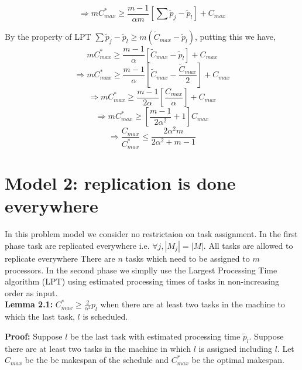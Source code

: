 \documentclass[10pt, conference, compsocconf]{IEEEtran}
\begin{document}
\begin{equation}\nonumber
\Rightarrow m C_{max}^{*}\geq \frac{m-1}{\alpha m} [\sum \tilde p_j-\tilde p_l] + {C_{max}}
 \end{equation}

By the property of LPT $\sum \tilde p_j-\tilde p_l \geq m (\tilde C_{max}-\tilde p_l)$, putting this we have,\\
\begin{equation}\nonumber 
 m C_{max}^{*}\geq \frac{m-1}{\alpha } \left[\tilde C_{max}-\tilde p_l\right] + {C_{max}}
 \end{equation}
\begin{equation}\nonumber
\Rightarrow m C_{max}^{*}\geq \frac{m-1}{\alpha } \left[\tilde C_{max}-\frac{\tilde C_{max}}{2}\right] + {C_{max}}
\end{equation}
\begin{equation}\nonumber
\Rightarrow m C_{max}^{*}\geq \frac{m-1}{2\alpha } \left[\frac{C_{max}} {\alpha} \right]+ {C_{max}}
\end{equation}
\begin{equation}\nonumber
\Rightarrow m C_{max}^{*}\geq \left[\frac{m-1}{2\alpha^{2} } +1\right]{C_{max}}
\end{equation}
\begin{equation}\nonumber
\Rightarrow \frac{C_{max}}{C_{max}^{*}}\leq \frac{2\alpha^{2}m}{2\alpha^{2}+ m-1}
\end{equation}



\section{Model 2: replication is done everywhere}
In this problem model we consider no restrictaion on task assignment.  In the first phase task are replicated everywhere i.e. $\forall j, |M_{j}|=|M|$.  All tasks are allowed to replicate everywhere There are $ n$ tasks which need to be  assigned to $m$ processors. In the second phase we   simplly use the  Largest Processing Time algorithm (LPT) using estimated processing times of tasks in non-increasing order as input.  \\




\textbf{Lemma 2.1:} $C_{max}^{*} \geq {\frac{2}{\alpha^{2}}} p_l $  when there are at least two tasks in the machine to which the last task, $l$ is scheduled.

\textbf{Proof:} Suppose $l$ be the last task with estimated processing time $\tilde p_l$. Suppose
there are at least two tasks in the machine in which $l$ is assigned including $l$. Let
$C_{max}$ be the be makespan of the schedule and $C_{max}^{*}$ be the optimal makespan.\\
\end{document}
